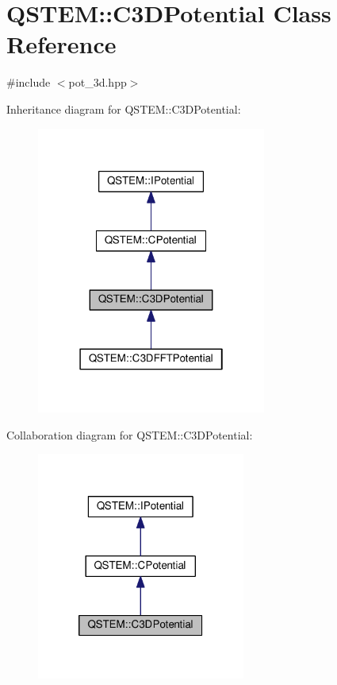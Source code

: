 \hypertarget{class_q_s_t_e_m_1_1_c3_d_potential}{\section{Q\-S\-T\-E\-M\-:\-:C3\-D\-Potential Class Reference}
\label{class_q_s_t_e_m_1_1_c3_d_potential}
}


{\ttfamily \#include $<$pot\-\_\-3d.\-hpp$>$}



Inheritance diagram for Q\-S\-T\-E\-M\-:\-:C3\-D\-Potential\-:
\nopagebreak
\begin{figure}[H]
\begin{center}
\leavevmode
\includegraphics[width=214pt]{class_q_s_t_e_m_1_1_c3_d_potential__inherit__graph}
\end{center}
\end{figure}


Collaboration diagram for Q\-S\-T\-E\-M\-:\-:C3\-D\-Potential\-:
\nopagebreak
\begin{figure}[H]
\begin{center}
\leavevmode
\includegraphics[width=194pt]{class_q_s_t_e_m_1_1_c3_d_potential__coll__graph}
\end{center}
\end{figure}
